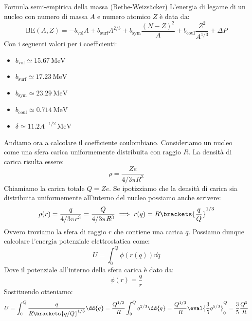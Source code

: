 \begin{theorem}{Formula semi-empirica della massa (Bethe-Weizsäcker)}
    L'energia di legame di un nucleo con numero di massa $A$ e numero atomico $Z$ è data da:
    \begin{equation}
        \text{BE}(A,Z) = -b_{\text{vol}} A + b_{\text{surf}} A^{2/3} + b_{\text{sym}} \dfrac{(N-Z)^2}{A} + b_{\text{coul}} \dfrac{Z^2}{A^{1/3}} + \Delta P
    \end{equation}
    Con i seguenti valori per i coefficienti:
    \begin{itemize}
        \item $b_{\text{vol}} \simeq \qty{15.67}{\mega\electronvolt}$
        \item $b_{\text{surf}} \simeq \qty{17.23}{\mega\electronvolt}$
        \item $b_{\text{sym}} \simeq \qty{23.29}{\mega\electronvolt}$
        \item $b_{\text{coul}} \simeq \qty{0.714}{\mega\electronvolt}$
        \item $\delta \simeq 11.2 A^{-1/2}\,\text{MeV}$
    \end{itemize}
\end{theorem}
Andiamo ora a calcolare il coefficiente coulombiano. Consideriamo un nucleo come una sfera carica uniformemente distribuita con raggio $R$. La densità di carica risulta essere:
\begin{equation}
 \rho = \dfrac{Ze}{4/3 \pi R^3}
\end{equation}
Chiamiamo la carica totale $Q = Ze$. Se ipotizziamo che la densità di carica sia distribuita uniformemente all'interno del nucleo possiamo anche scrivere:
\begin{equation}
  \rho (r) = \dfrac{q}{4/3 \pi r^3} = \dfrac{Q}{4/3 \pi R^3} \implies r(q) = R \brackets{\dfrac{q}{Q}}^{1/3}
\end{equation}
Ovvero troviamo la sfera di raggio $r$ che contiene una carica $q$. Possiamo dunque calcolare l'energia potenziale elettrostatica come:
\begin{equation}
  U = \int_0^{Q} \phi(r(q)) \dd{q}
\end{equation}
Dove il potenziale all'interno della sfera carica è dato da:
\begin{equation}
 \phi(r) = \dfrac{q}{r}
\end{equation}
Sostituendo otteniamo:
\begin{equation}
  U = \int_0^{Q} \dfrac{q}{R \brackets{q/Q}^{1/3}} \dd{q} = \dfrac{Q^{1/3}}{R} \int_0^{Q} q^{2/3} \dd{q} = \dfrac{Q^{1/3}}{R}\eval{\dfrac{3}{5} q^{5/3}}_{0}^{Q} = \dfrac{3}{5} \dfrac{Q^2}{R}
\end{equation}
